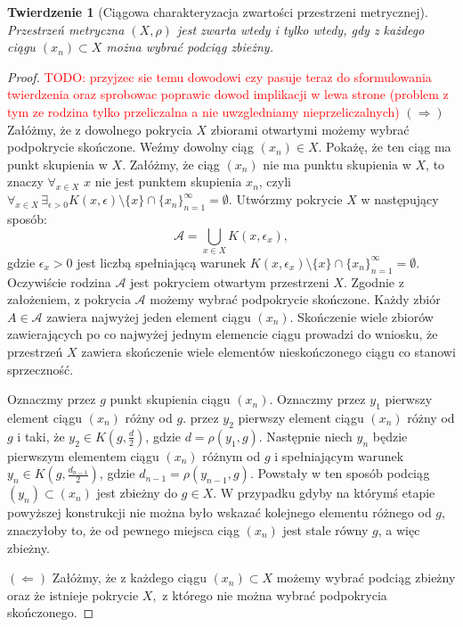 \documentclass[licencjacka]{pwr_wmat_praca_dyplomowa}
\theoremstyle{plain}
\newtheorem{theorem}{Twierdzenie}
\numberwithin{theorem}{chapter}
\theoremstyle{definition}
\numberwithin{theorem}{chapter}
\begin{document}
\begin{theorem}[Ciągowa charakteryzacja zwartości przestrzeni metrycznej]
\label{rownowaznosc_definicji_pokryciowej_i_ciagowej}
Przestrzeń metryczna $(X, \rho)$ jest zwarta wtedy i tylko wtedy, gdy z każdego ciągu $(x_n) \subset X$ można wybrać podciąg zbieżny.
\end{theorem}

\begin{proof}
\textcolor{red}{TODO: przyjzec sie temu dowodowi czy pasuje teraz do sformulowania twierdzenia oraz sprobowac poprawic dowod  implikacji w lewa strone (problem z tym ze rodzina tylko przeliczalna a nie uwzgledniamy nieprzeliczalnych)}
$(\Rightarrow)$
Załóżmy, że z dowolnego pokrycia $X$ zbiorami otwartymi możemy wybrać podpokrycie skończone. Weźmy dowolny ciąg $(x_n) \in X$. Pokażę, że ten ciąg ma punkt skupienia w $X$. Załóżmy, że ciąg $(x_n)$ nie ma punktu skupienia w $X$, to znaczy $\forall_{x \in X}$ $x$ nie jest punktem skupienia $x_n$, czyli $\forall_{x \in X} \, \exists_{\epsilon > 0}  K(x, \epsilon) \setminus \{x\} \cap \{x_n\}_{n=1}^{\infty} = \emptyset$. Utwórzmy pokrycie $X$ w następujący sposób: $$\mathcal{A} = \bigcup_{x \in X} K(x, \epsilon_x),$$ gdzie $\epsilon_x > 0$ jest liczbą spełniającą warunek $K(x, \epsilon_x) \setminus \{x\} \cap \{x_n\}_{n=1}^{\infty} = \emptyset$. Oczywiście rodzina $\mathcal{A}$ jest pokryciem otwartym przestrzeni $X$. Zgodnie z założeniem, z pokrycia $\mathcal{A}$ możemy wybrać podpokrycie skończone. Każdy zbiór $A \in \mathcal{A}$ zawiera najwyżej jeden element ciągu $(x_n)$. Skończenie wiele zbiorów zawierających po co najwyżej jednym elemencie ciągu prowadzi do wniosku, że przestrzeń $X$ zawiera skończenie wiele elementów nieskończonego ciągu co stanowi sprzeczność.

Oznaczmy przez $g$ punkt skupienia ciągu $(x_n)$. Oznaczmy przez $y_1$ pierwszy element ciągu $(x_n)$ różny od $g$. przez $y_2$ pierwszy element ciągu $(x_n)$ różny od $g$ i taki, że $y_2 \in K(g, \frac{d}{2})$, gdzie $d = \rho(y_1, g)$.
Następnie niech $y_n$ będzie pierwszym elementem ciągu $(x_n)$ różnym od $g$ i spełniającym warunek $y_n \in K(g, \frac{d_{n-1}}{2})$, gdzie $d_{n-1} = \rho(y_{n-1}, g)$. Powstały w ten sposób podciąg $(y_n) \subset (x_n)$ jest zbieżny do $g \in X$. W przypadku gdyby na którymś etapie powyższej konstrukcji nie można było wskazać kolejnego elementu różnego od $g$, znaczyłoby to, że od pewnego miejsca ciąg $(x_n)$ jest stale równy $g$, a więc zbieżny.

{\color{red}
$(\Leftarrow)$
Załóżmy, że z każdego ciągu $(x_n) \subset X$ możemy wybrać podciąg zbieżny oraz że istnieje pokrycie $X,$ z którego nie można wybrać podpokrycia skończonego.

}
\end{proof}
\end{document}
